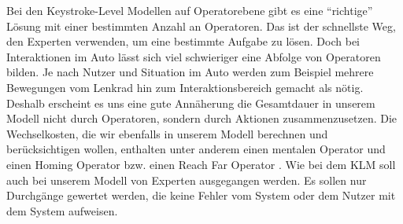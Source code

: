 Bei den Keystroke-Level Modellen auf Operatorebene gibt es eine "`richtige"' Lösung mit einer bestimmten Anzahl an Operatoren. 
Das ist der schnellste Weg, den Experten verwenden, um eine bestimmte Aufgabe zu lösen. 
Doch bei Interaktionen im Auto lässt sich viel schwieriger eine Abfolge von Operatoren bilden. 
Je nach Nutzer und Situation im Auto werden zum Beispiel mehrere Bewegungen vom Lenkrad hin zum Interaktionsbereich gemacht als nötig. 
Deshalb erscheint es uns eine gute Annäherung die Gesamtdauer in unserem Modell nicht durch Operatoren, sondern durch Aktionen zusammenzusetzen. 
Die Wechselkosten, die wir ebenfalls in unserem Modell berechnen und berücksichtigen wollen, enthalten unter anderem einen mentalen Operator und einen Homing Operator \citep{Card_1980} bzw. einen Reach Far Operator \citep{Green_2002}. 
Wie bei dem KLM soll auch bei unserem Modell von Experten ausgegangen werden. 
Es sollen nur Durchgänge gewertet werden, die keine Fehler vom System oder dem Nutzer mit dem System aufweisen.